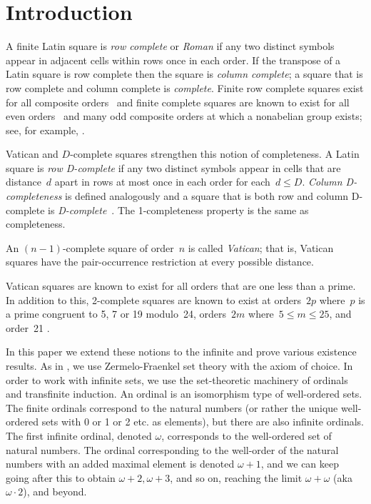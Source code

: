 \documentclass[12pt,a4paper]{article}
\begin{document}
\section{Introduction}\label{sec:intro}


A finite Latin square is {\em row complete} or {\em Roman} if  any two distinct symbols appear in adjacent cells within rows once in each order.  If the transpose of a Latin square is row complete then the square is {\em column complete}; a square that is row complete and column complete is {\em complete}.  Finite row complete squares exist for all composite orders~\cite{Higham98} and finite complete squares are known to exist for all even orders~\cite{Gordon61} and many odd composite orders at which a nonabelian group exists; see, for example, \cite{Ollis14}.

Vatican and $D$-complete  squares strengthen this notion of completeness. 
A Latin square is {\em row D-complete} if any two distinct symbols appear in cells that are distance~$d$ apart in rows at most once in each order for each~$d \leq D$. {\em Column D-completeness} is defined analogously and a square that is both row and column D-complete is {\em D-complete}~\cite{Anderson90}.  The 1-completeness property is the same as completeness.

An $(n-1)$-complete square of order~$n$ is called {\em Vatican}; that is, Vatican squares have the pair-occurrence restriction at every possible distance.

Vatican squares are known to exist for all orders that are one less than a prime.  In addition to this, 2-complete squares are known to exist at orders~$2p$ where~$p$ is a prime congruent to 5, 7 or 19 modulo~24, orders~$2m$ where~$5 \leq m \leq 25$, and order~21 \cite{TuscanCRC,OllisTFSG}.


In this paper we extend these notions to the infinite and prove various existence results.  As in \cite{CW02}, we use Zermelo-Fraenkel set theory with the axiom of choice. In order to work with infinite sets, we use the set-theoretic machinery of ordinals and transfinite induction. An ordinal is an isomorphism type of well-ordered sets. The finite ordinals correspond to the natural numbers (or rather
the unique well-ordered sets with 0 or 1 or 2 etc. as elements), but there are also infinite ordinals.
The first infinite ordinal, denoted $\omega$, corresponds to the well-ordered set of natural numbers.
The ordinal corresponding to the well-order of the natural numbers with an added maximal element is
denoted $\omega+1$, and we can keep going after this to obtain $\omega+2, \omega+3$, and so on, reaching the limit $\omega+\omega$ (aka $\omega\cdot 2$), and beyond.   
\end{document}
